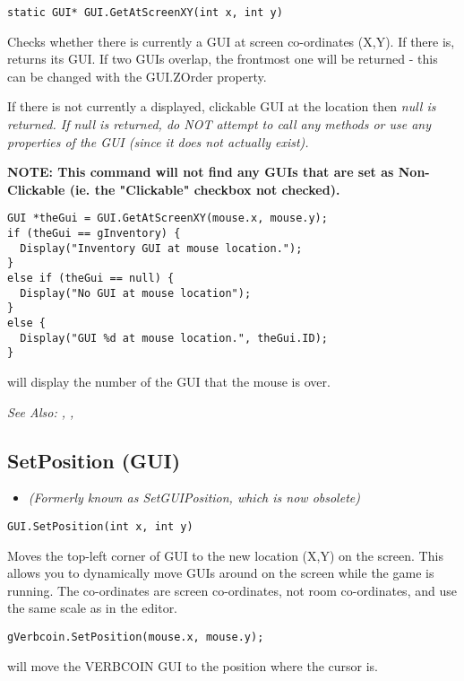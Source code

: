 \begin{verbatim}
static GUI* GUI.GetAtScreenXY(int x, int y)
\end{verbatim}
Checks whether there is currently a GUI at screen co-ordinates (X,Y). If
there is, returns its GUI. If two GUIs overlap, the frontmost one will
be returned - this can be changed with the GUI.ZOrder property.

If there is not currently a displayed, clickable GUI at the location then
\it{null} is returned. If null is returned, do NOT attempt to call any methods
or use any properties of the GUI (since it does not actually exist).

\bf{NOTE:} This command will not find any GUIs that are set as Non-Clickable (ie.
the "Clickable" checkbox not checked).

\begin{verbatim}
GUI *theGui = GUI.GetAtScreenXY(mouse.x, mouse.y);
if (theGui == gInventory) {
  Display("Inventory GUI at mouse location.");
}
else if (theGui == null) {
  Display("No GUI at mouse location");
}
else {
  Display("GUI %d at mouse location.", theGui.ID);
}
\end{verbatim}
will display the number of the GUI that the mouse is over.

\it{See Also:} , ,


\subsection{SetPosition (GUI)}\label{GUI.SetPosition}%

\begin{itemize}
\item \it{(Formerly known as SetGUIPosition, which is now obsolete)}
\end{itemize}

\begin{verbatim}
GUI.SetPosition(int x, int y)
\end{verbatim}
Moves the top-left corner of GUI to the new location (X,Y) on the screen.
This allows you to dynamically move GUIs around on the screen while the
game is running. The co-ordinates are screen co-ordinates, not room
co-ordinates, and use the same scale as in the editor.

\begin{verbatim}
gVerbcoin.SetPosition(mouse.x, mouse.y);
\end{verbatim}
will move the VERBCOIN GUI to the position where the cursor is.


